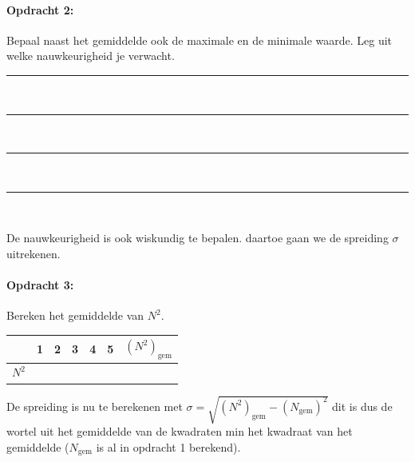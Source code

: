 \bigskip{}

\begin{minipage}[t]{1\columnwidth}%

\paragraph{Opdracht 2:}

Bepaal naast het gemiddelde ook de maximale en de minimale
waarde. Leg uit welke nauwkeurigheid je verwacht.

\begin{center}
    \rule{\textwidth}{0.3mm}\\
    \rule{\textwidth}{0.3mm}\\
    \rule{\textwidth}{0.3mm}\\
    \rule{\textwidth}{0.3mm}\\
\end{center}
\end{minipage}

\bigskip{}


De nauwkeurigheid is ook wiskundig te bepalen. daartoe gaan we de spreiding $\sigma$ uitrekenen.

\begin{minipage}[t]{1\columnwidth}%

\paragraph{Opdracht 3:}

Bereken het gemiddelde van $N^{2}$.

\bigskip{}


\begin{tabular}{|x{.11\textwidth}|x{.11\textwidth}|x{.11\textwidth}
                |x{.11\textwidth}|x{.11\textwidth}|x{.11\textwidth}
                |x{.11\textwidth}|}
     & 1 & 2 & 3 & 4 & 5 & $\left(N^{2}\right)_\textrm{gem}$\\
    \hline
    $N^{2}$ &  &  &  &  &  & \\
    \hline
\end{tabular}

\bigskip{}

De spreiding is nu te berekenen met
$\sigma=\sqrt{\left(N^{2}\right)_\textrm{gem}-\left(N_\textrm{gem}\right)^{2}}$ dit is
dus de wortel uit het gemiddelde van de kwadraten min het kwadraat van
het gemiddelde ($N_\textrm{gem}$ is al in opdracht 1 berekend).

\end{minipage}


